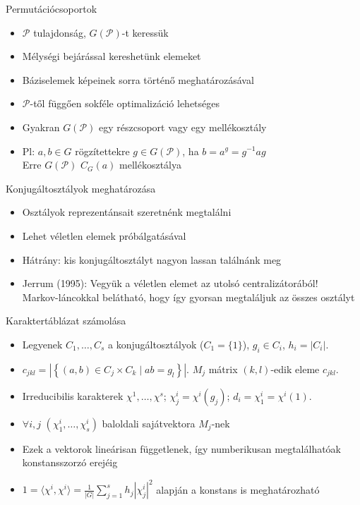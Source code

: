 \documentclass[mathserif]{beamer}
\begin{document}
\begin{frame}{Permutációcsoportok}
\begin{itemize}
\item $\mathcal{P}$ tulajdonság, $G(\mathcal{P})$-t keressük
\item Mélységi bejárással kereshetünk elemeket
\item Báziselemek képeinek sorra történő meghatározásával
\item $\mathcal{P}$-től függően sokféle optimalizáció lehetséges
\item Gyakran $G(\mathcal{P})$ egy részcsoport vagy egy mellékosztály
\item Pl: $a,b\in G$ rögzítettekre $g \in G(\mathcal{P})$, ha $b = a^g = g^{-1}ag$\\
Erre $G(\mathcal{P})$ $C_G(a)$ mellékosztálya
\end{itemize}
\end{frame}

\begin{frame}{Konjugáltosztályok meghatározása}
\begin{itemize}
\item Osztályok reprezentánsait szeretnénk megtalálni
\item Lehet véletlen elemek próbálgatásával
\item Hátrány: kis konjugáltosztályt nagyon lassan találnánk meg
\item Jerrum (1995): Vegyük a véletlen elemet az utolsó centralizátorából!\\
Markov-láncokkal belátható, hogy így gyorsan megtaláljuk az összes osztályt
\end{itemize}
\end{frame}

\begin{frame}{Karaktertáblázat számolása}
\begin{itemize}
\item Legyenek $C_1, \dots, C_s$ a konjugáltosztályok ($C_1 = \{1\}$), $g_i \in C_i$, $h_i = |C_i|$.
\item $c_{jkl} = \left|\left\{(a,b)\in C_j \times C_k \mid ab = g_l\right\}\right|$. $M_j$ mátrix $(k,l)$-edik eleme $c_{jkl}$.
\item Irreducibilis karakterek $\chi^1, \dots, \chi^s$; $\chi^i_j = \chi^i(g_j)$; $d_i = \chi^i_1 = \chi^i(1)$.
\item $\forall i,j$ $(\chi^i_1,\dots,\chi^i_s)$ baloldali sajátvektora $M_j$-nek
\item Ezek a vektorok lineárisan függetlenek, így numberikusan megtalálhatóak konstansszorzó erejéig
\item $1 = \langle \chi^i, \chi^i \rangle = \frac{1}{|G|}\sum_{j=1}^s h_j |\chi^i_j|^2$ alapján a konstans is meghatározható
\end{itemize}
\end{frame}
\end{document}

